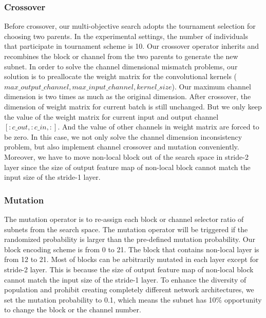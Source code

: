 \documentclass[journal]{IEEEtran}
\newcommand{\revised}[1]{{\color{black} #1}}
\begin{document}
\subsubsection{\textbf{Crossover}}\label{crossover_operator}
Before crossover, our multi-objective search \revised{adopts} the tournament selection for choosing two parents. In the experimental settings, the number of individuals that participate in tournament scheme is 10. Our crossover operator inherits and recombines the block or channel from the two parents to generate the new subnet. \revised{In order to solve the channel dimensional mismatch problems, our solution is to preallocate the weight matrix for the convolutional kernels ($ max\_output\_channel, max\_input\_channel, kernel\_size $). Our maximum channel dimension is two times as much as the original dimension. After crossover, the dimension of weight matrix for current batch is still unchanged. But we only keep the value of the weight matrix for current input and output channel $ [:c\_out, :c\_in, :] $. And the value of other channels in weight matrix are forced to be zero. In this case, we not only solve the channel dimension inconsistency problem, but also implement channel crossover and mutation conveniently. Moreover, we have to move non-local block out of the search space in stride-2 layer since the size of output feature map of non-local block cannot match the input size of the stride-1 layer}. 







\subsubsection{\textbf{Mutation}}\label{mutation_operator}
The mutation operator is to re-assign each block or channel selector ratio of subnets from the search space. The mutation operator will be triggered if the randomized probability is larger than the pre-defined mutation probability. Our block encoding scheme is from 0 to 21. The block that contains non-local layer is from 12 to 21. \revised{Most of blocks can be arbitrarily mutated in each layer except for stride-2 layer. This is because the size of output feature map of non-local block cannot match the input size of the stride-1 layer. To enhance the diversity of population and prohibit creating completely different network architectures, we set the mutation probability to 0.1, which means the subnet has 10$\%$ opportunity to change the block or the channel number.}
\end{document}
